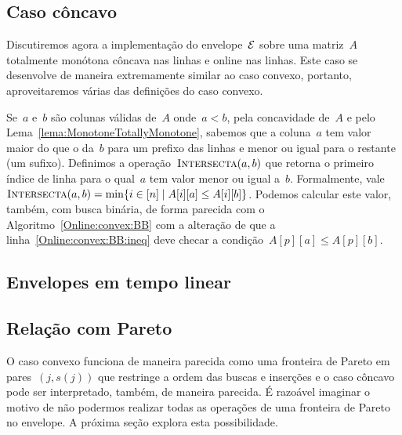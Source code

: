 
\subsection{Caso côncavo} \label{Online:concave}

Discutiremos agora a implementação do envelope~$\mathcal{E}$ sobre uma matriz~$A$ totalmente monótona côncava nas linhas e online nas linhas. Este caso se desenvolve de maneira extremamente similar ao caso convexo, portanto, aproveitaremos várias das definições do caso convexo.

Se~$a$ e~$b$ são colunas válidas de~$A$ onde~$a < b$, pela concavidade de~$A$ e pelo Lema~\ref{lema:MonotoneTotallyMonotone}, sabemos que a coluna~$a$ tem valor maior do que o da~$b$ para um prefixo das linhas e menor ou igual para o restante (um sufixo). Definimos a operação~$\textsc{Intersecta}(a,b)$ que retorna o primeiro índice de linha para o qual~$a$ tem valor menor ou igual a~$b$. Formalmente, vale~${\textsc{Intersecta}(a,b) = \min\{i \in [n] \mid A[i][a] \leq A[i][b]\}}$. Podemos calcular este valor, também, com busca binária, de forma parecida com o Algoritmo~\ref{Online:convex:BB} com a alteração de que a linha~\ref{Online:convex:BB:ineq} deve checar a condição~$A[p][a] \leq A[p][b]$.


\subsection{Envelopes em tempo linear} \label{Online:linear}


\subsection{Relação com Pareto}

O caso convexo funciona de maneira parecida como uma fronteira de Pareto em pares~$(j,s(j))$ que restringe a ordem das buscas e inserções e o caso côncavo pode ser interpretado, também, de maneira parecida. É razoável imaginar o motivo de não podermos realizar todas as operações de uma fronteira de Pareto no envelope. A próxima seção explora esta possibilidade.
